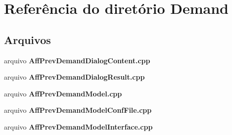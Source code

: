 \section{Referência do diretório Demand}
\label{dir_9a9d72803de5c259ad3e97c3c6be182e}
\subsection*{Arquivos}
\begin{DoxyCompactItemize}
\item 
arquivo {\bf Aff\+Prev\+Demand\+Dialog\+Content.\+cpp}
\item 
arquivo {\bf Aff\+Prev\+Demand\+Dialog\+Result.\+cpp}
\item 
arquivo {\bf Aff\+Prev\+Demand\+Model.\+cpp}
\item 
arquivo {\bf Aff\+Prev\+Demand\+Model\+Conf\+File.\+cpp}
\item 
arquivo {\bf Aff\+Prev\+Demand\+Model\+Interface.\+cpp}
\end{DoxyCompactItemize}
